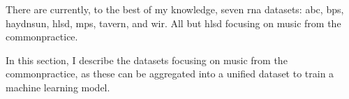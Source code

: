 
There are currently, to the best of my knowledge, seven
\gls{rna} datasets: \gls{abc}, \gls{bps}, \gls{haydnsun},
\gls{hlsd}, \gls{mps}, \gls{tavern}, and \gls{wir}. All but
\gls{hlsd} focusing on music from the \gls{commonpractice}.

In this section, I describe the datasets focusing on music
from the \gls{commonpractice}, as these can be aggregated
into a unified dataset to train a machine learning model.